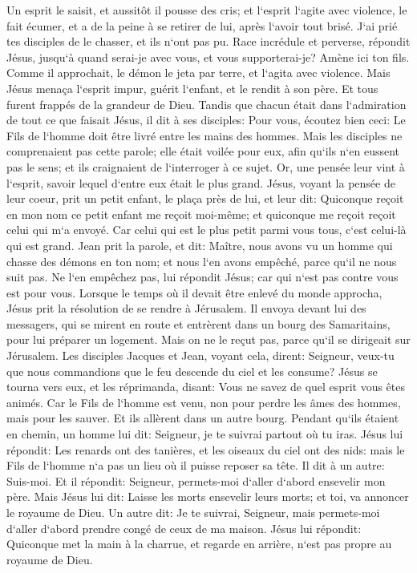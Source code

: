 \verse Un esprit le saisit, et aussitôt il pousse des cris; et l`esprit l`agite avec violence, le fait écumer, et a de la peine à se retirer de lui, après l`avoir tout brisé. 
\verse J`ai prié tes disciples de le chasser, et ils n`ont pas pu. 
\verse Race incrédule et perverse, répondit Jésus, jusqu`à quand serai-je avec vous, et vous supporterai-je? Amène ici ton fils. 
\verse Comme il approchait, le démon le jeta par terre, et l`agita avec violence. Mais Jésus menaça l`esprit impur, guérit l`enfant, et le rendit à son père. 
\verse Et tous furent frappés de la grandeur de Dieu. Tandis que chacun était dans l`admiration de tout ce que faisait Jésus, il dit à ses disciples: 
\verse Pour vous, écoutez bien ceci: Le Fils de l`homme doit être livré entre les mains des hommes. 
\verse Mais les disciples ne comprenaient pas cette parole; elle était voilée pour eux, afin qu`ils n`en eussent pas le sens; et ils craignaient de l`interroger à ce sujet. 
\verse Or, une pensée leur vint à l`esprit, savoir lequel d`entre eux était le plus grand. 
\verse Jésus, voyant la pensée de leur coeur, prit un petit enfant, le plaça près de lui, 
\verse et leur dit: Quiconque reçoit en mon nom ce petit enfant me reçoit moi-même; et quiconque me reçoit reçoit celui qui m`a envoyé. Car celui qui est le plus petit parmi vous tous, c`est celui-là qui est grand. 
\verse Jean prit la parole, et dit: Maître, nous avons vu un homme qui chasse des démons en ton nom; et nous l`en avons empêché, parce qu`il ne nous suit pas. 
\verse Ne l`en empêchez pas, lui répondit Jésus; car qui n`est pas contre vous est pour vous. 
\verse Lorsque le temps où il devait être enlevé du monde approcha, Jésus prit la résolution de se rendre à Jérusalem. 
\verse Il envoya devant lui des messagers, qui se mirent en route et entrèrent dans un bourg des Samaritains, pour lui préparer un logement. 
\verse Mais on ne le reçut pas, parce qu`il se dirigeait sur Jérusalem. 
\verse Les disciples Jacques et Jean, voyant cela, dirent: Seigneur, veux-tu que nous commandions que le feu descende du ciel et les consume? 
\verse Jésus se tourna vers eux, et les réprimanda, disant: Vous ne savez de quel esprit vous êtes animés. 
\verse Car le Fils de l`homme est venu, non pour perdre les âmes des hommes, mais pour les sauver. Et ils allèrent dans un autre bourg. 
\verse Pendant qu`ils étaient en chemin, un homme lui dit: Seigneur, je te suivrai partout où tu iras. 
\verse Jésus lui répondit: Les renards ont des tanières, et les oiseaux du ciel ont des nids: mais le Fils de l`homme n`a pas un lieu où il puisse reposer sa tête. 
\verse Il dit à un autre: Suis-moi. Et il répondit: Seigneur, permets-moi d`aller d`abord ensevelir mon père. 
\verse Mais Jésus lui dit: Laisse les morts ensevelir leurs morts; et toi, va annoncer le royaume de Dieu. 
\verse Un autre dit: Je te suivrai, Seigneur, mais permets-moi d`aller d`abord prendre congé de ceux de ma maison. 
\verse Jésus lui répondit: Quiconque met la main à la charrue, et regarde en arrière, n`est pas propre au royaume de Dieu. 

